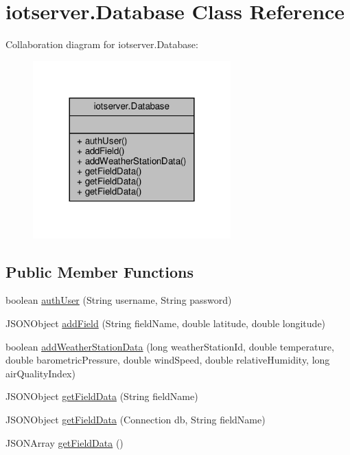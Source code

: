 \hypertarget{classiotserver_1_1Database}{}\section{iotserver.\+Database Class Reference}
\label{classiotserver_1_1Database}


Collaboration diagram for iotserver.\+Database\+:\nopagebreak
\begin{figure}[H]
\begin{center}
\leavevmode
\includegraphics[width=216pt]{classiotserver_1_1Database__coll__graph}
\end{center}
\end{figure}
\subsection*{Public Member Functions}
\begin{DoxyCompactItemize}
\item 
boolean \hyperlink{classiotserver_1_1Database_a2a4ab1640565d077045f9867c59a2573}{auth\+User} (String username, String password)
\item 
J\+S\+O\+N\+Object \hyperlink{classiotserver_1_1Database_ac0c9d5c5ea706160d836578c8019d1a7}{add\+Field} (String field\+Name, double latitude, double longitude)
\item 
boolean \hyperlink{classiotserver_1_1Database_ae7dfbdcecabac722a8f3ef63a73559b5}{add\+Weather\+Station\+Data} (long weather\+Station\+Id, double temperature, double barometric\+Pressure, double wind\+Speed, double relative\+Humidity, long air\+Quality\+Index)
\item 
J\+S\+O\+N\+Object \hyperlink{classiotserver_1_1Database_a2c12fba48ac94748e7ce8fb412b19c1e}{get\+Field\+Data} (String field\+Name)
\item 
J\+S\+O\+N\+Object \hyperlink{classiotserver_1_1Database_ac968e2f70df507390dcd535660801c5e}{get\+Field\+Data} (Connection db, String field\+Name)
\item 
J\+S\+O\+N\+Array \hyperlink{classiotserver_1_1Database_ab92010b913a502847e7a062d2aa9ad72}{get\+Field\+Data} ()
\end{DoxyCompactItemize}



